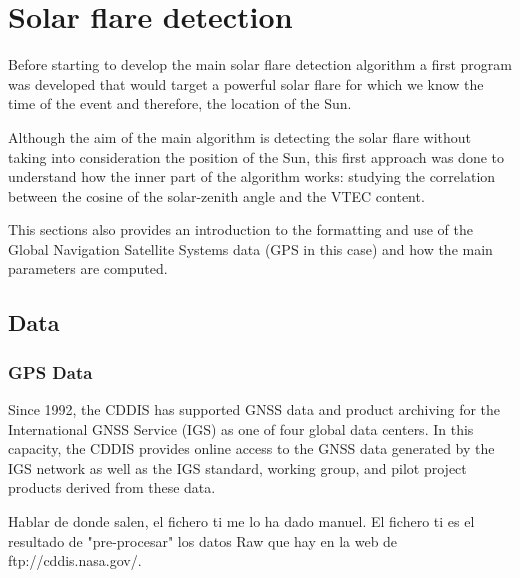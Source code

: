 \chapter{Solar flare detection}

Before starting to develop the main solar flare detection algorithm a first program was developed that would target a powerful solar flare for which we know the time of the event and therefore, the location of the Sun.

Although the aim of the main algorithm is detecting the solar flare without taking into consideration the position of the Sun, this first approach was done to understand how the inner part of the algorithm works: studying the correlation between the cosine of the solar-zenith angle and the VTEC content.

This sections also provides an introduction to the formatting and use of the Global Navigation Satellite Systems data (GPS in this case) and how the main parameters are computed.

\section{Data}

\subsection{GPS Data}

Since 1992, the CDDIS has supported GNSS data and product archiving for the International GNSS Service (IGS) as one of four global data centers. In this capacity, the CDDIS provides online access to the GNSS data generated by the IGS network as well as the IGS standard, working group, and pilot project products derived from these data.

Hablar de donde salen, el fichero ti me lo ha dado manuel. El fichero ti es el resultado de "pre-procesar" los datos Raw que hay en la web de ftp://cddis.nasa.gov/.















